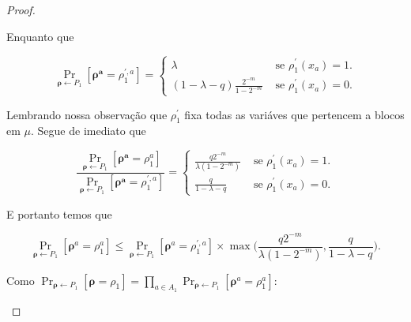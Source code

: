\begin{proof}
\begin{enumerate}
	Enquanto que
	
	\begin{equation*}
		\Pr_{\boldsymbol{\rho} \leftarrow P_{1}}[\boldsymbol{\rho^{a}} = \rho_{1}^{\prime, a}] = \begin{cases}
																 	\lambda & \text{ se } \rho_{1}^{\prime}(x_{a}) = 1. \\
																 	(1 - \lambda - q)\frac{2^{-m}}{1 - 2^{-m}} & \text{ se } \rho_{1}^{\prime}(x_{a}) = 0.
		                                                        									 \end{cases}
	\end{equation*}

	Lembrando nossa observação que $\rho_{1}^{\prime}$ fixa todas as variáves que pertencem a blocos em $\mu$. Segue de imediato que
	
	\begin{equation*}
		\frac{\Pr_{\boldsymbol{\rho} \leftarrow P_{1}}[\boldsymbol{\rho^{a}} = \rho_{1}^{a}]}{\Pr_{\boldsymbol{\rho} \leftarrow P_{1}}[\boldsymbol{\rho^{a}} = \rho_{1}^{\prime, a}]} = \begin{cases}
																													         	\frac{q2^{-m}}{\lambda(1 - 2^{-m})} & \text{ se } \rho_{1}^{\prime}(x_{a}) = 1. \\
																													         	\frac{q}{1 - \lambda - q} & \text{ se } \rho_{1}^{\prime}(x_{a}) = 0.
																													         \end{cases}
	\end{equation*}


	E portanto temos que
	
	\begin{equation} \label{projection_switching_lemma_eq1}
		\Pr_{\boldsymbol{\rho} \leftarrow P_{1}}[\boldsymbol{\rho}^{a} = \rho_{1}^{a}] \leq \Pr_{\boldsymbol{\rho} \leftarrow P_{1}}[\boldsymbol{\rho}^{a} = \rho_{1}^{\prime, a}] \times \max\bigg(\frac{q2^{-m}}{\lambda(1 - 2^{-m})}, \frac{q}{1 - \lambda - q} \bigg).
	\end{equation}
	
	Como $\Pr_{\boldsymbol{\rho} \leftarrow P_{1}}[\boldsymbol{\rho} = \rho_{1}] = \prod_{a \in A_{1}}\Pr_{\boldsymbol{\rho} \leftarrow P_{1}}[\boldsymbol{\rho}^{a} = \rho_{1}^{a}]$:
	

\end{enumerate}
\end{proof}
